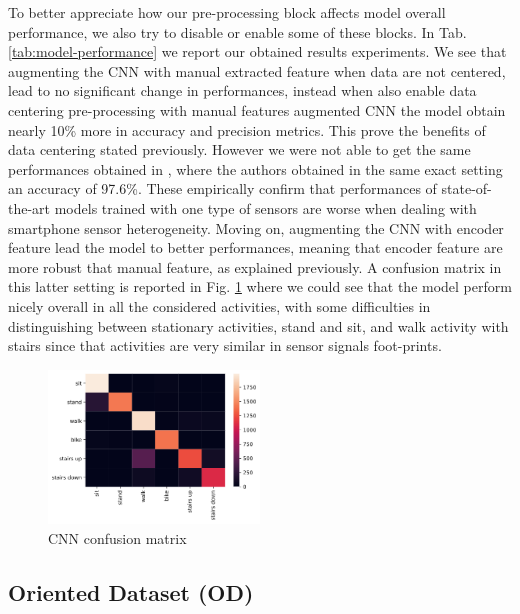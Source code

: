 To better appreciate how our pre-processing block affects model overall performance, we also try to disable or enable some of these blocks. In Tab. \ref{tab:model-performance} we report our obtained results experiments. We see that augmenting the CNN with manual extracted feature when data are not centered, lead to no significant change in performances, instead when also enable data centering pre-processing with manual features augmented CNN the model obtain nearly 10\% more in accuracy and precision metrics. This prove the benefits of data centering stated previously. However we were not able to get the same performances obtained in \cite{ignatov2018real}, where the authors obtained in the same exact setting an accuracy of 97.6\%. These empirically confirm that performances of state-of-the-art models trained with one type of sensors are worse when dealing with smartphone sensor heterogeneity. Moving on, augmenting the CNN with encoder feature lead the model to better performances, meaning that encoder feature are more robust that manual feature, as explained previously. A confusion matrix in this latter setting is reported in Fig. \ref{fig:cnn-confusion-matrix} where we could see that the model perform nicely overall in all the considered activities, with some difficulties in distinguishing between stationary activities, stand and sit, and walk activity with stairs since that activities are very similar in sensor signals foot-prints.

\begin{figure}[h]
	\centering
	\includegraphics[width=0.5\textwidth]{images/confusion_matrix.png}
	\caption{CNN confusion matrix}
	\label{fig:cnn-confusion-matrix}
\end{figure}


\subsection{Oriented Dataset (OD)}

